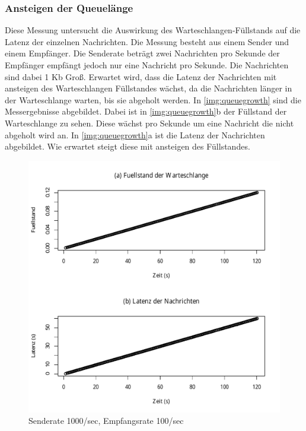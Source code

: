 \subsubsection{Ansteigen der Queuelänge}
\label{sec:queueGrowth}
Diese Messung untersucht die Auswirkung des Warteschlangen-Füllstands auf die Latenz der einzelnen Nachrichten. Die Messung besteht aus einem Sender und einem Empfänger. Die Senderate beträgt zwei Nachrichten pro Sekunde der Empfänger empfängt jedoch nur eine Nachricht pro Sekunde. Die Nachrichten sind dabei 1 Kb Groß. Erwartet wird, dass die Latenz der Nachrichten mit ansteigen des Warteschlangen Füllstandes wächst, da die Nachrichten länger in der Warteschlange warten, bis sie abgeholt werden.
In \autoref{img:queuegrowth} sind die Messergebnisse abgebildet. Dabei ist in \autoref{img:queuegrowth}b der Füllstand der Warteschlange zu sehen. Diese wächst pro Sekunde um eine Nachricht die nicht abgeholt wird an. In \autoref{img:queuegrowth}a ist die Latenz der Nachrichten abgebildet. Wie erwartet steigt diese mit ansteigen des Füllstandes.
\begin{figure}
\center
  \includegraphics[width=1\textwidth]{images/measurement/queuegrowth.pdf}
  \caption{Senderate 1000/sec, Empfangsrate 100/sec}
  \label{img:queuegrowth}
\end{figure}


